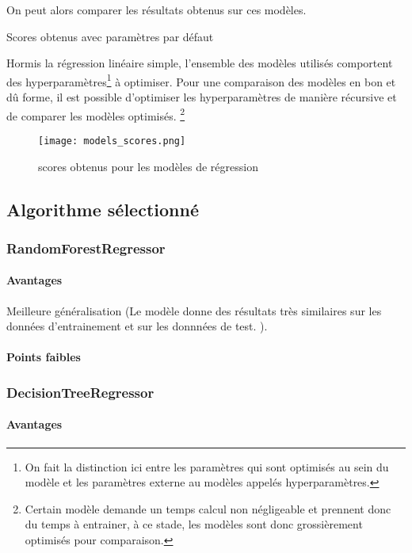 On peut alors comparer les résultats obtenus sur ces modèles.
\begin{table}[H]
  
  \caption{Scores obtenus avec paramètres par défaut}
  \label{}
\end{table}

Hormis la régression linéaire simple, l'ensemble des modèles utilisés comportent
des hyperparamètres\footnote{On fait la distinction ici entre les paramètres
qui sont optimisés au sein du modèle et les paramètres externe au modèles appelés
hyperparamètres.} à optimiser.
Pour une comparaison des modèles en bon et dû forme, il est possible d'optimiser
les hyperparamètres de manière récursive et de comparer les modèles optimisés.
\footnote{Certain modèle demande un temps calcul non négligeable et prennent donc
du temps à entrainer, à ce stade, les modèles sont donc grossièrement optimisés
pour comparaison.}

\begin{figure}[H]
  \texttt{[image: models\_scores.png]}
  \caption{scores obtenus pour les modèles de régression}
  \label{}
\end{figure}

\subsection{Algorithme sélectionné}

\subsubsection{RandomForestRegressor}

\paragraph{Avantages} Meilleure généralisation
(Le modèle donne des résultats très similaires sur les données d'entrainement et
sur les donnnées de test. ).

\paragraph{Points faibles}

\subsubsection{DecisionTreeRegressor}

\paragraph{Avantages}

